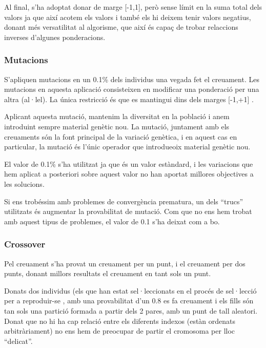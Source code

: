 \documentclass[titlepage,a4paper,12pt]{book}
\begin{document}
Al final, s'ha adoptat donar de marge [-1,1], però sense límit en la suma total
dels valors ja que així acotem els valors i també els hi deixem tenir valors
negatius, donant més versatilitat al algorisme, que així és capaç de trobar
relaccions inverses d'algunes ponderacions.


\subsubsection{Mutacions} %
\label{ssub:Mutacions}

S'apliquen mutacions en un 0.1\% dels individus una vegada fet el creuament.
Les mutacions en aquesta aplicació consisteixen en modificar una ponderació per
una altra (al·lel).  La única restricció és que es mantingui dins dels marges
[-1,+1] .  

Aplicant aquesta mutació, mantenim la diversitat en la població i anem
introduint sempre material genètic nou.  La mutació, juntament amb els
creuaments són la font principal de la variació genètica, i en aquest cas en
particular, la mutació és l'únic operador que introdueoix material genètic nou.

El valor de 0.1\% s'ha utilitzat ja que és un valor estàndard, i les variacions
que hem aplicat a posteriori sobre aquest valor no han aportat millores
objectives a les solucions.

Si ens trobéssim amb problemes de convergència prematura, un dels ``trucs''
utilitzats és augmentar la provabilitat de mutació.  Com que no ens hem trobat
amb aquest tipus de problemes, el valor de 0.1 s'ha deixat com a bo.

\subsubsection{Crossover} %
\label{ssub:Crossover}

Pel creuament s'ha provat un creuament per un punt, i el creuament per dos
punts, donant millors resultats el creuament en tant sols un punt.  

Donats dos individus (els que han estat sel·leccionats en el procés de
sel·lecció per a reproduir-se , amb una provabilitat d'un 0.8 es fa creuament i
els fills són tan sols una partició formada a partir dels 2 pares, amb un punt
de tall aleatori.  Donat que no hi ha cap relació entre els diferents indexos
(estàn ordenats arbitràriament) no ens hem de preocupar de partir el cromosoma
per lloc ``delicat''. 
\end{document}
